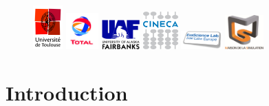 \documentclass[oneside,english,onecolumn,letterpaper]{book}
\begin{document}
\begin{figure}[htbp]
\begin{centering}
\includegraphics[width=0.102\textwidth]{figures/logo_Univ_Toulouse}\vspace*{2truemm}
\includegraphics[width=0.112\textwidth]{figures/logo_TOTAL}\vspace*{2truemm}
\includegraphics[width=0.130\textwidth]{figures/logo_Fairbanks}\vspace*{2truemm}
\includegraphics[width=0.120\textwidth]{figures/logo_CINECA}\vspace*{2truemm}
\includegraphics[width=0.140\textwidth]{figures/logo_Intel_Exascale_Labs}\vspace*{2truemm}
\includegraphics[width=0.130\textwidth]{figures/logo_Maison_Simulation}
\par\end{centering}
\end{figure}

\newpage

\tableofcontents


\chapter{Introduction}
\end{document}
